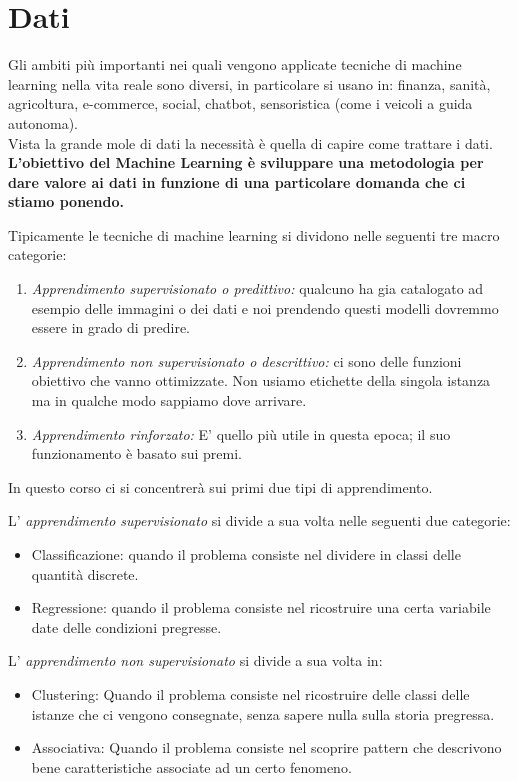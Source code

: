 \section{Dati}
Gli ambiti più importanti nei quali vengono applicate tecniche di machine learning nella vita reale sono diversi, in particolare si usano in:
finanza, sanità, agricoltura, e-commerce, social, chatbot, sensoristica (come i veicoli a guida autonoma).
\\ Vista la grande mole di dati la necessità è quella di capire come trattare i dati.
\textbf{L'obiettivo del Machine Learning è sviluppare una metodologia per dare valore ai dati in funzione di una particolare domanda che ci stiamo ponendo.}

Tipicamente le tecniche di machine learning si dividono nelle seguenti tre macro categorie:
\begin{enumerate}
	\item \textit{Apprendimento supervisionato o predittivo:} qualcuno ha gia catalogato ad esempio delle immagini o dei dati e noi prendendo questi modelli dovremmo essere in grado di predire.
	\item \textit{Apprendimento non supervisionato o descrittivo:} ci sono delle funzioni obiettivo che vanno ottimizzate. Non usiamo etichette della singola istanza ma in qualche modo sappiamo dove arrivare.
	\item \textit{Apprendimento rinforzato:} E' quello più utile in questa epoca; il suo funzionamento è basato sui premi.
\end{enumerate}

In questo corso ci si concentrerà sui primi due tipi di apprendimento.

L' \textit{apprendimento supervisionato} si divide a sua volta nelle seguenti due categorie:
\begin{itemize}
	\item Classificazione: quando il problema consiste nel dividere in classi delle quantità discrete.
	\item Regressione: quando il problema consiste nel ricostruire una certa variabile date delle condizioni pregresse.
\end{itemize}

L' \textit{apprendimento non supervisionato} si divide a sua volta in:
\begin{itemize}
	\item Clustering: Quando il problema consiste nel ricostruire delle classi delle istanze che ci vengono consegnate, senza sapere nulla sulla storia pregressa.
	\item Associativa: Quando il problema consiste nel scoprire pattern che descrivono bene caratteristiche associate ad un certo fenomeno.
\end{itemize}

